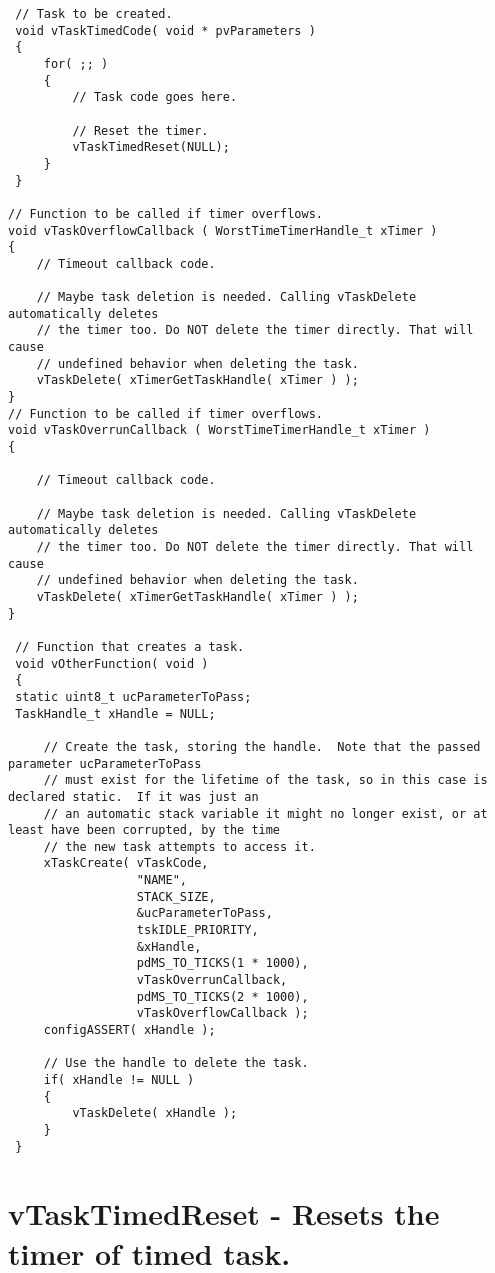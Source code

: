 \begin{verbatim}
 // Task to be created.
 void vTaskTimedCode( void * pvParameters )
 {
     for( ;; )
     {
         // Task code goes here.

         // Reset the timer.
         vTaskTimedReset(NULL);
     }
 }

// Function to be called if timer overflows.
void vTaskOverflowCallback ( WorstTimeTimerHandle_t xTimer )
{
    // Timeout callback code.

    // Maybe task deletion is needed. Calling vTaskDelete automatically deletes
    // the timer too. Do NOT delete the timer directly. That will cause
    // undefined behavior when deleting the task.
    vTaskDelete( xTimerGetTaskHandle( xTimer ) );
}
// Function to be called if timer overflows.
void vTaskOverrunCallback ( WorstTimeTimerHandle_t xTimer )
{

    // Timeout callback code.

    // Maybe task deletion is needed. Calling vTaskDelete automatically deletes
    // the timer too. Do NOT delete the timer directly. That will cause
    // undefined behavior when deleting the task.
    vTaskDelete( xTimerGetTaskHandle( xTimer ) );
}

 // Function that creates a task.
 void vOtherFunction( void )
 {
 static uint8_t ucParameterToPass;
 TaskHandle_t xHandle = NULL;

     // Create the task, storing the handle.  Note that the passed parameter ucParameterToPass
     // must exist for the lifetime of the task, so in this case is declared static.  If it was just an
     // an automatic stack variable it might no longer exist, or at least have been corrupted, by the time
     // the new task attempts to access it.
     xTaskCreate( vTaskCode,
                  "NAME",
                  STACK_SIZE,
                  &ucParameterToPass,
                  tskIDLE_PRIORITY,
                  &xHandle,
                  pdMS_TO_TICKS(1 * 1000),
                  vTaskOverrunCallback,
                  pdMS_TO_TICKS(2 * 1000),
                  vTaskOverflowCallback );
     configASSERT( xHandle );

     // Use the handle to delete the task.
     if( xHandle != NULL )
     {
         vTaskDelete( xHandle );
     }
 }

\end{verbatim}

\section{vTaskTimedReset -  Resets the timer of timed task.}
\label{rt_cmd:vTaskTimedReset}


